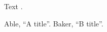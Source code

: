\documentclass{article}
\begin{document}
Text \cite{a,b}.
\begin{description}
\newcommand{\enquote}[1]{``#1''}
 Able, \enquote{A title}.
 Baker, \enquote{B title}.
\end{description}
\end{document}
